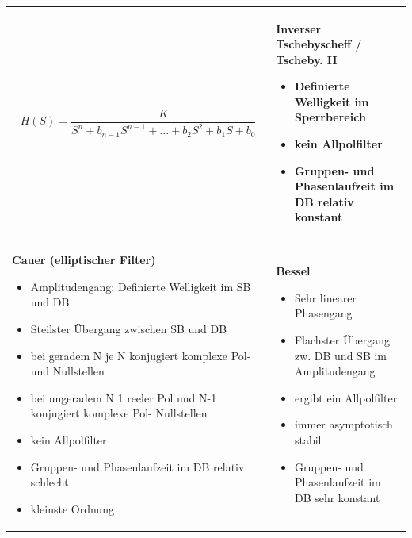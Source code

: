 \begin{tabular}{|p{9cm}|p{9cm}|}
{\begin{itemize}
	\end{itemize}
  \[ H(S) = \frac{K}{S^n +b_{n-1}S^{n-1}+\ldots+b_2S^2+b_1S+b_0}\]
	}
&
 \parbox[t]{9cm}{
	\textbf{Inverser Tschebyscheff  / Tscheby. II} 
	\begin{itemize}
    \item Definierte Welligkeit im Sperrbereich
    \item kein Allpolfilter
    \item Gruppen- und Phasenlaufzeit im DB relativ konstant
	\end{itemize}
	} \\
\hline
\parbox[t]{6cm}{
	\textbf{Cauer (elliptischer Filter)} 
	\begin{itemize}
    \item Amplitudengang: Definierte Welligkeit im SB und DB
    \item Steilster Übergang zwischen SB und DB
    \item bei geradem N je N konjugiert komplexe Pol- und Nullstellen
    \item bei ungeradem N 1 reeler Pol und N-1 konjugiert komplexe Pol- Nullstellen
    \item kein Allpolfilter
    \item Gruppen- und Phasenlaufzeit im DB relativ schlecht
    \item kleinste Ordnung
	\end{itemize}
	}
& 
\parbox[t]{6cm}{
	\textbf{Bessel} 
	\begin{itemize}
    \item Sehr linearer Phasengang
    \item Flachster Übergang zw. DB und SB im Amplitudengang
    \item ergibt ein Allpolfilter
    \item immer asymptotisch stabil
    \item Gruppen- und Phasenlaufzeit im DB sehr konstant
	\end{itemize}
	} \\
\hline
\end{tabular}
\vfill

